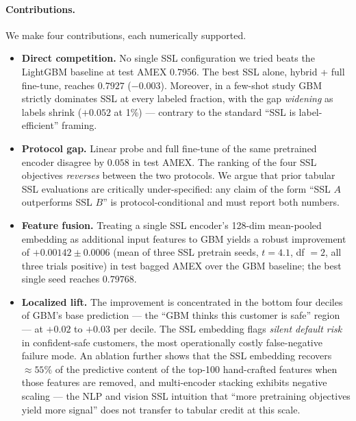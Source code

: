 \documentclass[sigconf, anonymous, review]{acmart}
\begin{document}
\paragraph{Contributions.}
We make four contributions, each numerically supported.

\begin{itemize}
  \item \textbf{Direct competition.} No single SSL configuration we
        tried beats the LightGBM baseline at test AMEX $0.7956$. The
        best SSL alone, hybrid + full fine-tune, reaches $0.7927$
        ($-0.003$). Moreover, in a few-shot study GBM strictly
        dominates SSL at every labeled fraction, with the gap
        \emph{widening} as labels shrink ($+0.052$ at 1\%) ---
        contrary to the standard ``SSL is label-efficient'' framing.
  \item \textbf{Protocol gap.} Linear probe and full fine-tune of the
        same pretrained encoder disagree by $0.058$ in test AMEX. The
        ranking of the four SSL objectives \emph{reverses} between
        the two protocols. We argue that prior tabular SSL evaluations
        are critically under-specified: any claim of the form ``SSL
        $A$ outperforms SSL $B$'' is protocol-conditional and must
        report both numbers.
  \item \textbf{Feature fusion.} Treating a single SSL encoder's
        128-dim mean-pooled embedding as additional input features to
        GBM yields a robust improvement of $+0.00142 \pm 0.0006$
        (mean of three SSL pretrain seeds, $t = 4.1$, df $= 2$, all
        three trials positive) in test bagged AMEX over the GBM
        baseline; the best single seed reaches $0.79768$.
  \item \textbf{Localized lift.} The improvement is concentrated in
        the bottom four deciles of GBM's base prediction --- the
        ``GBM thinks this customer is safe'' region --- at
        $+0.02$ to $+0.03$ per decile. The SSL embedding flags
        \emph{silent default risk} in confident-safe customers, the
        most operationally costly false-negative failure mode. An
        ablation further shows that the SSL embedding recovers
        $\approx 55\%$ of the predictive content of the top-100
        hand-crafted features when those features are removed, and
        multi-encoder stacking exhibits negative scaling --- the NLP
        and vision SSL intuition that ``more pretraining objectives
        yield more signal'' does not transfer to tabular credit at
        this scale.
\end{itemize}
\end{document}
